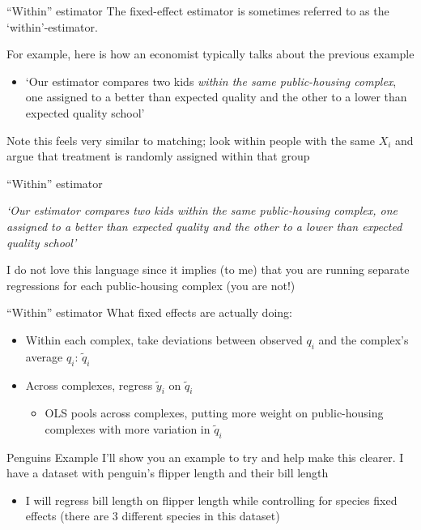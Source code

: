 \documentclass[aspectratio=169,t,11pt,table]{beamer}
\begin{document}
\begin{frame}{``Within'' estimator}
  The fixed-effect estimator is sometimes referred to as the `within'-estimator. 
  
  \bigskip 
  For example, here is how an economist typically talks about the previous example
  \begin{itemize}
    \item `Our estimator compares two kids \alert{\emph{within the same public-housing complex}}, one assigned to a better than expected quality and the other to a lower than expected quality school'
  \end{itemize}

  \pause
  \bigskip
  Note this feels very similar to matching; look within people with the same $X_i$ and argue that treatment is randomly assigned within that group 
\end{frame}

\begin{frame}{``Within'' estimator}
  \begin{center}
    \emph{`Our estimator compares two kids \alert{\emph{within the same public-housing complex}}, one assigned to a better than expected quality and the other to a lower than expected quality school'}
  \end{center}

  \bigskip
  I do not love this language since it implies (to me) that you are running separate regressions for each public-housing complex (you are not!)
\end{frame}

\begin{frame}{``Within'' estimator}
  What fixed effects are actually doing: 
  
  \begin{itemize}
    \item Within each complex, take deviations between observed $q_i$ and the complex's average $q_i$: $\tilde{q}_i$
    
    \item Across complexes, regress $\tilde{y}_i$ on $\tilde{q}_i$
    \begin{itemize}
      \item OLS pools across complexes, putting more weight on public-housing complexes with more variation in $\tilde{q}_i$
    \end{itemize}
  \end{itemize}
\end{frame}


\begin{frame}{Penguins Example}
  I'll show you an example to try and help make this clearer. I have a dataset with penguin's flipper length and their bill length
  \begin{itemize}
    \item I will regress bill length on flipper length while controlling for species fixed effects (there are 3 different species in this dataset)
  \end{itemize}
\end{frame}
\end{document}
